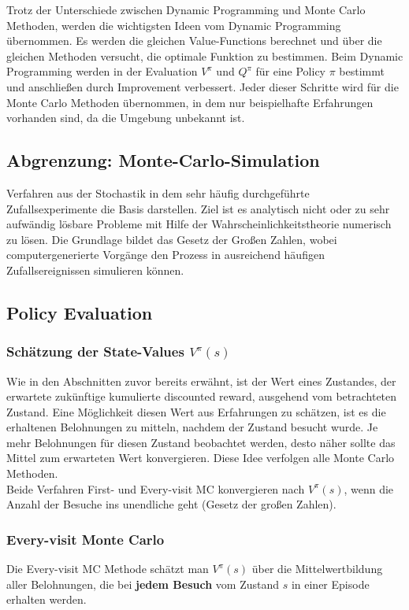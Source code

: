 \documentclass[10pt]{scrartcl}
\begin{document}
Trotz der Unterschiede zwischen Dynamic Programming und Monte Carlo Methoden, werden die wichtigsten Ideen vom Dynamic Programming übernommen. Es werden die gleichen Value-Functions berechnet und über die gleichen Methoden versucht, die optimale Funktion zu bestimmen. Beim Dynamic Programming werden in der Evaluation $V^{\pi}$ und $Q^{\pi}$ für eine Policy $\pi$ bestimmt und anschließen durch Improvement verbessert. Jeder dieser Schritte wird für die Monte Carlo Methoden übernommen, in dem nur beispielhafte Erfahrungen vorhanden sind, da die Umgebung unbekannt ist.

\subsection{Abgrenzung: Monte-Carlo-Simulation}
Verfahren aus der Stochastik in dem sehr häufig durchgeführte Zufallsexperimente die Basis darstellen. Ziel ist es analytisch nicht oder zu sehr aufwändig lösbare Probleme mit Hilfe der Wahrscheinlichkeitstheorie numerisch zu lösen. Die Grundlage bildet das Gesetz der Großen Zahlen, wobei computergenerierte Vorgänge den Prozess in ausreichend häufigen Zufallsereignissen simulieren können.

\subsection{Policy Evaluation}
\subsubsection{Schätzung der State-Values $V^{\pi}(s)$}
Wie in den Abschnitten zuvor bereits erwähnt, ist der Wert eines Zustandes, der erwartete zukünftige kumulierte discounted reward, ausgehend vom betrachteten Zustand. Eine Möglichkeit diesen Wert aus Erfahrungen zu schätzen, ist es die erhaltenen Belohnungen zu mitteln, nachdem der Zustand besucht wurde. Je mehr Belohnungen für diesen Zustand beobachtet werden, desto näher sollte das Mittel zum erwarteten Wert konvergieren. Diese Idee verfolgen alle Monte Carlo Methoden.\\
Beide Verfahren First- und Every-visit MC konvergieren nach $V^{\pi}(s)$, wenn die Anzahl der Besuche ins unendliche geht (Gesetz der großen Zahlen).

\subsubsection{Every-visit Monte Carlo}
Die Every-visit MC Methode schätzt man $V^{\pi}(s)$ über die Mittelwertbildung aller Belohnungen, die bei \textbf{jedem Besuch} vom Zustand $s$ in einer Episode erhalten werden.
\end{document}
